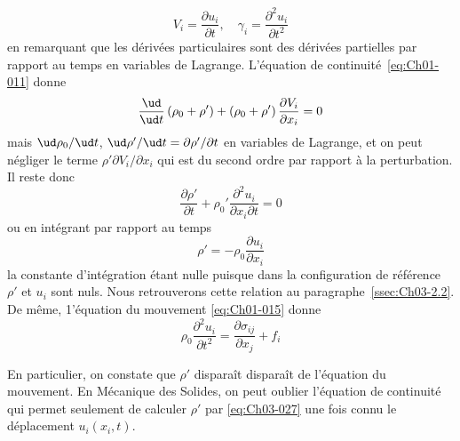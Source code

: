 \begin{enumerate}
\begin{equation}
            V_i = \frac{\partial u_i}{\partial t}, \quad \gamma_i = \frac{\partial^2 u_i}{\partial t^2}
            \label{eq:Ch03-026}
        \end{equation}
        en remarquant que les dérivées particulaires sont des dérivées partielles par rapport au temps en variables de Lagrange.
        L'équation de continuité~\eqref{eq:Ch01-011} donne
        \begin{equation*}
            \frac{\ud}{\ud t} \left( \rho_0 +\rho' \right) + \left( \rho_0 + \rho' \right) \frac{\partial V_i}{\partial x_i} = 0
        \end{equation*}
        mais  $\ud \rho_0/\ud t$, $\ud \rho' / \ud t = \partial \rho' / \partial t$ en variables de Lagrange, et on peut négliger le  terme $\rho' \partial V_i / \partial x_i$ qui est du second ordre par rapport à la perturbation.
        Il  reste  donc
        \begin{equation*}
            \frac{\partial \rho'}{\partial t} + \rho_0' \frac{\partial^2 u_i}{\partial x_i \partial t} = 0
        \end{equation*}
        ou en intégrant par rapport au temps
        \begin{equation}
            \rho' = - \rho_0 \frac{\partial u_i}{\partial x_i}
            \label{eq:Ch03-027}
        \end{equation}
        la constante d'intégration étant nulle puisque dans la configuration de référence $\rho'$ et $u_i$ sont nuls.
        Nous retrouverons cette relation au paragraphe~\ref{ssec:Ch03-2.2}.
        De même, 1'équation du mouvement \eqref{eq:Ch01-015} donne
        \begin{equation}
            \rho_0 \frac{\partial^2 u_i}{\partial t^2} = \frac{\partial \sigma_{ij}}{\partial x_j} + f_i
            \label{eq:Ch03-028}
        \end{equation}
\end{enumerate}
En particulier, on constate que $\rho'$ disparaît disparaît de l'équation du mouvement.
En Mécanique des Solides, on peut oublier l'équation de continuité qui permet seulement de calculer $\rho'$ par \eqref{eq:Ch03-027} une fois connu le déplacement $u_i \left( x_i, t \right)$.
